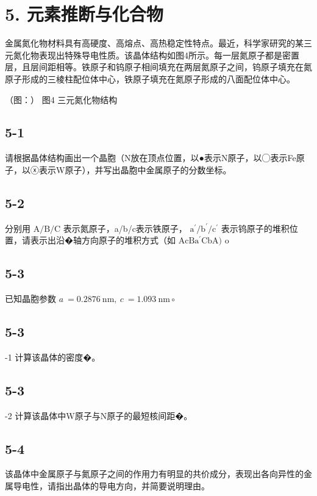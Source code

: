 \section*{5. 元素推断与化合物}
⾦属氮化物材料具有⾼硬度、⾼熔点、⾼热稳定性特点。最近，科学家研究的某三元氮化物表现出特殊导电性质。该晶体结构如图4所⽰。每⼀层氮原⼦都是密置层，且层间距相等。铁原⼦和钨原⼦相间填充在两层氮原⼦之间，钨原⼦填充在氮原⼦形成的三棱柱配位体中⼼，铁原⼦填充在氮原⼦形成的⼋⾯配位体中⼼。

（图：）
图4 三元氮化物结构

\subsection*{5-1}
请根据晶体结构画出⼀个晶胞（N放在顶点位置，以●表⽰N原⼦，以◯表⽰Fe原⼦，以ⓧ表⽰W原⼦），并写出晶胞中⾦属原⼦的分数坐标。

\subsection*{5-2}
分别⽤ $\mathrm { A / B / C }$ 表⽰氮原⼦，a/b/c表⽰铁原⼦， $\mathrm { a ^ { \prime } / b ^ { \prime } / c ^ { \prime } }$ 表⽰钨原⼦的堆积位置，请表⽰出沿�轴⽅向原⼦的堆积⽅式（如 $\mathrm { { A c B a ^ { \prime } C b A } ) }$ o

\subsection*{5-3}
已知晶胞参数 $a \ = 0 . 2 8 7 6 \ \mathrm { n m } , \ c \ = 1 . 0 9 3 \ \mathrm { n m } \circ$

\subsection*{5-3}
-1 计算该晶体的密度�。

\subsection*{5-3}
-2 计算该晶体中W原⼦与N原⼦的最短核间距�。

\subsection*{5-4}
该晶体中⾦属原⼦与氮原⼦之间的作⽤⼒有明显的共价成分，表现出各向异性的⾦属导电性，请指出晶体的导电⽅向，并简要说明理由。
